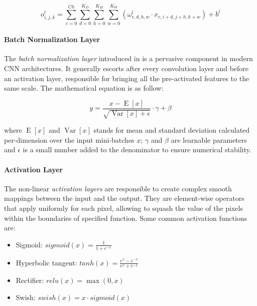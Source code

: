             \begin{equation}
                o_{i,j,k}^l = \sum_{c=0}^{Ch}\sum_{d=0}^{K_D}\sum_{h=0}^{K_H}\sum_{w=0}^{K_W}\left(\omega_{c,d,h,w}^l \cdot x_{c,i+d,j+h,k+w}\right) + b^l
            \end{equation}

        \paragraph{Batch Normalization Layer}
            The \textit{batch normalization layer} introduced in \cite{ioffe2015batchnorm} is a pervasive component in modern CNN architectures.
            It generally escorts after every convolution layer and before an activation layer, responsible for bringing all the pre-activated features to the same scale.
            The mathematical equation is as follow:

            \begin{equation}
                y = \frac{x - \operatorname{E}[x]}{\sqrt{\operatorname{Var}[x] + \epsilon}} \cdot \gamma + \beta
            \end{equation}

            where $\operatorname{E}[x]$ and $\operatorname{Var}[x]$ stands for mean and standard deviation calculated per-dimension over the input mini-batches $x$; $\gamma$ and $\beta$ are learnable parameters and $\epsilon$ is a small number added to the denominator to ensure numerical stability.

        \paragraph{Activation Layer}
            The non-linear \textit{activation layers} are responsible to create complex smooth mappings between the input and the output.
            They are element-wise operators that apply uniformly for each pixel, allowing to squash the value of the pixels within the boundaries of specified function.
            Some common activation functions are:

            \begin{itemize}
                \item Sigmoid: $sigmoid\left(x\right) = \frac{1}{1 + e^{-x}}$
                \item Hyperbolic tangent: $tanh\left(x\right) = \frac{e^{x} - e^{-x}}{e^{x} + e^{-x}}$
                \item Rectifier: $relu\left(x\right) = \max\left(0, x\right)$
                \item Swish: $swish\left(x\right) = x \cdot sigmoid\left(x\right)$
            \end{itemize}


